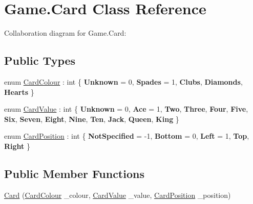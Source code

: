 \hypertarget{class_game_1_1_card}{}\section{Game.\+Card Class Reference}
\label{class_game_1_1_card}


Collaboration diagram for Game.\+Card\+:
\subsection*{Public Types}
\begin{DoxyCompactItemize}
\item 
enum \hyperlink{class_game_1_1_card_a76a5a259d3d61f379fb2354192753789}{Card\+Colour} \+: int \{ \newline
{\bfseries Unknown} = 0, 
{\bfseries Spades} = 1, 
{\bfseries Clubs}, 
{\bfseries Diamonds}, 
\newline
{\bfseries Hearts}
 \}
\item 
enum \hyperlink{class_game_1_1_card_a17c2bb5fb12e206639e218492d78578a}{Card\+Value} \+: int \{ \newline
{\bfseries Unknown} = 0, 
{\bfseries Ace} = 1, 
{\bfseries Two}, 
{\bfseries Three}, 
\newline
{\bfseries Four}, 
{\bfseries Five}, 
{\bfseries Six}, 
{\bfseries Seven}, 
\newline
{\bfseries Eight}, 
{\bfseries Nine}, 
{\bfseries Ten}, 
{\bfseries Jack}, 
\newline
{\bfseries Queen}, 
{\bfseries King}
 \}
\item 
enum \hyperlink{class_game_1_1_card_a9b35cee58d08386bc6f1d3cc7e6c6999}{Card\+Position} \+: int \{ \newline
{\bfseries Not\+Specified} = -\/1, 
{\bfseries Bottom} = 0, 
{\bfseries Left} = 1, 
{\bfseries Top}, 
\newline
{\bfseries Right}
 \}
\end{DoxyCompactItemize}
\subsection*{Public Member Functions}
\begin{DoxyCompactItemize}
\item 
\hyperlink{class_game_1_1_card_ac495ed67b2e07198c0b2193ad4422c90}{Card} (\hyperlink{class_game_1_1_card_a76a5a259d3d61f379fb2354192753789}{Card\+Colour} \+\_\+colour, \hyperlink{class_game_1_1_card_a17c2bb5fb12e206639e218492d78578a}{Card\+Value} \+\_\+value, \hyperlink{class_game_1_1_card_a9b35cee58d08386bc6f1d3cc7e6c6999}{Card\+Position} \+\_\+position)
\end{DoxyCompactItemize}
